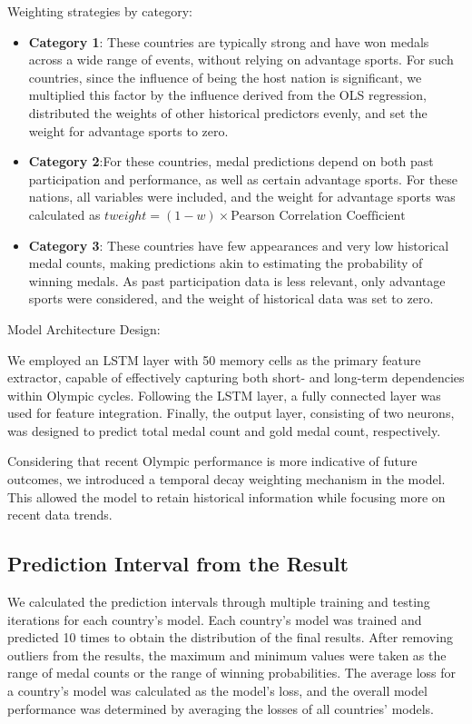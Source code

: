 \documentclass{mcmthesis}
\begin{document}
Weighting strategies by category:
\begin{itemize}
    \item {\bf Category 1}: These countries are typically strong and have won medals across a wide range of events, without relying on advantage sports. For such countries, since the influence of being the host nation is significant, we multiplied this factor by the influence derived from the OLS regression, distributed the weights of other historical predictors evenly, and set the weight for advantage sports to zero.
    \item {\bf Category 2}:For these countries, medal predictions depend on both past participation and performance, as well as certain advantage sports. For these nations, all variables were included, and the weight for advantage sports was calculated as $t{weight} = (1-w) \times \text{Pearson Correlation Coefficient}$
    \item {\bf Category 3}:  These countries have few appearances and very low historical medal counts, making predictions akin to estimating the probability of winning medals. As past participation data is less relevant, only advantage sports were considered, and the weight of historical data was set to zero.
\end{itemize}
Model Architecture Design:

We employed an LSTM layer with 50 memory cells as the primary feature extractor, capable of effectively capturing both short- and long-term dependencies within Olympic cycles. Following the LSTM layer, a fully connected layer was used for feature integration. Finally, the output layer, consisting of two neurons, was designed to predict total medal count and gold medal count, respectively.

Considering that recent Olympic performance is more indicative of future outcomes, we introduced a temporal decay weighting mechanism in the model. This allowed the model to retain historical information while focusing more on recent data trends.

\subsection{Prediction Interval from the Result}
We calculated the prediction intervals through multiple training and testing iterations for each country's model. Each country's model was trained and predicted 10 times to obtain the distribution of the final results. After removing outliers from the results, the maximum and minimum values were taken as the range of medal counts or the range of winning probabilities. The average loss for a country's model was calculated as the model's loss, and the overall model performance was determined by averaging the losses of all countries' models.
\end{document}
